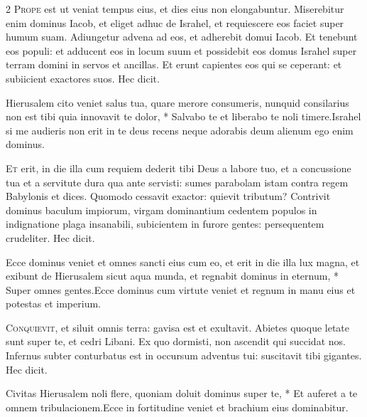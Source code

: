 \begin{multicols*}{2}
\lettrine[lines=2]{\zallmancaps \color{Blue} P}{rope} est ut veniat tempus eius, et dies eius non elongabuntur. Miserebitur enim dominus Iacob, et eliget adhuc de Israhel, et requiescere eos faciet super humum suam. Adiungetur advena ad eos, et adherebit domui Iacob. Et tenebunt eos populi: et adducent eos in locum suum et possidebit eos domus Israhel super terram domini in servos et ancillas. Et erunt capientes eos qui se ceperant: et subiicient exactores suos. Hec dicit.
\begin{responsory}
{Hierusalem cito veniet salus tua, quare merore consumeris, nunquid consilarius non est tibi quia innovavit te dolor, * Salvabo te et liberabo te noli timere.}{Israhel si me audieris non erit in te deus recens neque adorabis deum alienum ego enim dominus.}
\end{responsory}%
\lettrine[lines=2]{\zallmancaps \color{Blue} E}{t} erit, in die illa cum requiem dederit tibi Deus a labore tuo, et a concussione tua et a servitute dura qua ante servisti: sumes parabolam istam contra regem Babylonis et dices. Quomodo cessavit exactor: quievit tributum? Contrivit dominus baculum impiorum, virgam dominantium cedentem populos in indignatione plaga insanabili, subicientem in furore gentes: persequentem crudeliter. Hec dicit.
\begin{responsory}
{Ecce dominus veniet et omnes sancti eius cum eo, et erit in die illa lux magna, et exibunt de Hierusalem sicut aqua munda, et regnabit dominus in eternum, * Super omnes gentes.}{Ecce dominus cum virtute veniet et regnum in manu eius et potestas et imperium.}
\end{responsory}%
\lettrine[lines=2]{\zallmancaps \color{Red} C}{onquievit}, et siluit omnis terra: gavisa est et exultavit. Abietes quoque letate sunt super te, et cedri Libani. Ex quo dormisti, non ascendit qui succidat nos. Infernus subter conturbatus est in occursum adventus tui: suscitavit tibi gigantes. Hec dicit.
\begin{responsory-doxology}
{Civitas Hierusalem noli flere, quoniam doluit dominus super te, * Et auferet a te omnem tribulacionem.}{Ecce in fortitudine veniet et brachium eius dominabitur.}
\end{responsory-doxology}%

\end{multicols*}
